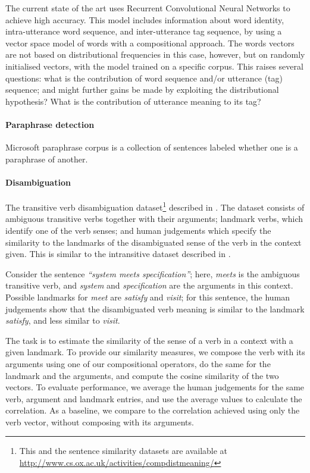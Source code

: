 The current state of the art \cite{kalchbrenner-blunsom2013CVSC} uses
Recurrent Convolutional Neural Networks to achieve high accuracy. This
model includes information about word identity, intra-utterance word
sequence, and inter-utterance tag sequence, by using a vector space
model of words with a compositional approach. The words vectors are
not based on distributional frequencies in this case, however, but on
randomly initialised vectors, with the model trained on a specific
corpus. This raises several questions: what is the contribution of
word sequence and/or utterance (tag) sequence; and might further gains
be made by exploiting the distributional hypothesis? What is the contribution of
utterance meaning to its tag?

\paragraph{Paraphrase detection}
\label{sec:paraphrase}

Microsoft paraphrase corpus \cite{dolan2005microsoft} is a collection of
sentences labeled whether one is a paraphrase of another.

\paragraph{Disambiguation}
\label{sec:disamb}

The transitive verb disambiguation dataset\footnote{This and the sentence
  similarity datasets are available at
  \url{http://www.cs.ox.ac.uk/activities/compdistmeaning/}} described in
\cite{grefenstette2011gems}. The dataset consists of ambiguous transitive verbs
together with their arguments; landmark verbs, which identify one of the verb
senses; and human judgements which specify the similarity to the landmarks of
the disambiguated sense of the verb in the context given. This is similar to the
intransitive dataset described in \cite{mitchell2008vector}.

Consider the sentence \textit{``system meets specification''}; here,
\textit{meets} is the ambiguous transitive verb, and \textit{system}
and \textit{specification} are the arguments in this context. Possible
landmarks for \emph{meet} are \textit{satisfy} and \textit{visit}; for
this sentence, the human judgements show that the disambiguated verb
meaning is similar to the landmark \textit{satisfy}, and less similar
to \textit{visit}.

The task is to estimate the similarity of the sense of a verb in a context with
a given landmark. To provide our similarity measures, we compose the verb with
its arguments using one of our compositional operators, do the same for the
landmark and the arguments, and compute the cosine similarity of the two
vectors. To evaluate performance, we average the human judgements for the same
verb, argument and landmark entries, and use the average values to calculate the
correlation. As a baseline, we compare to the correlation achieved using only
the verb vector, without composing with its arguments.

